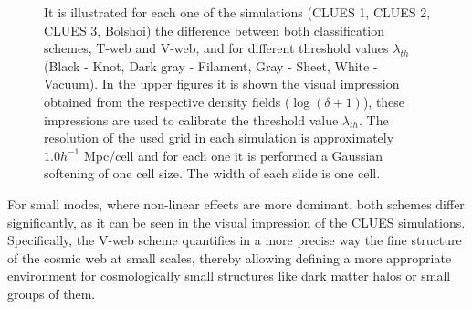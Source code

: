\begin{figure}[htbp]
	\begin{center}
	\end{center}

	\caption{\small{It is illustrated for each one of the simulations
	(CLUES 1, CLUES 2, CLUES 3, Bolshoi) the difference between both 
	classification schemes, T-web and V-web, and for different threshold
	values $\lambda_{th}$ (Black - Knot, Dark gray - Filament, Gray - Sheet,
	White - Vacuum). In the upper figures it is shown the visual impression
	obtained from the respective density fields ($\log (\delta+1)$), these
	impressions are used to calibrate the threshold value $\lambda_{th}$.
	The resolution of the used grid in each simulation is approximately 
	$1.0 h^{-1}$ Mpc/cell and for each one it is performed a Gaussian 
	softening of one cell size. The width of each slide is one cell.}}
	
	\label{fig:TwebVwebComparison}
\end{figure}


For small modes, where non-linear effects are more dominant, both schemes
differ significantly, as it can be seen in the visual impression of
the CLUES simulations. Specifically, the V-web scheme quantifies in a more
precise way the fine structure of the cosmic web at small scales, thereby 
allowing defining a more appropriate environment for cosmologically small 
structures like dark matter halos or small groups of them.


